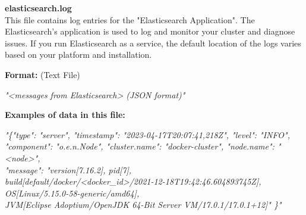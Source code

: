 \begin{description}
\begin{addmargin}[0em]{0em}
    \label{elasticsearch.log}
    \begin{addmargin}[1em]{0em} %
        \textbf{elasticsearch.log}\\
        This file contains log entries for the "Elasticsearch Application".
        The Elasticsearch’s application is used to log and monitor your cluster and diagnose issues.
        If you run Elasticsearch as a service, the default location of the logs varies based on your platform and installation.
        \begin{addmargin}[1em]{0em}
            \textbf{Format:} (Text File)
            \begin{addmargin}[1em]{0em}
                \textit{"<messages from Elasticsearch> (JSON format)"}
            \end{addmargin}
        \end{addmargin}
        \begin{addmargin}[1em]{0em}
            \textbf{Examples of data in this file:}
            \begin{addmargin}[1em]{0em}\textit{"\{"type": "server", "timestamp": "2023-04-17T20:07:41,218Z", "level": "INFO",\\
                "component": "o.e.n.Node", "cluster.name": "docker-cluster", "node.name": "<node>",\\
                "message": "version[7.16.2], pid[7],\\
                build[default/docker/<docker\_id>/2021-12-18T19:42:46.604893745Z],\\
                OS[Linux/5.15.0-58-generic/amd64],\\
                JVM[Eclipse Adoptium/OpenJDK 64-Bit Server VM/17.0.1/17.0.1+12]" \}"}
            \end{addmargin}
        \end{addmargin}
    \end{addmargin} %
    \textbf{\\}


\end{addmargin}
\end{description}
